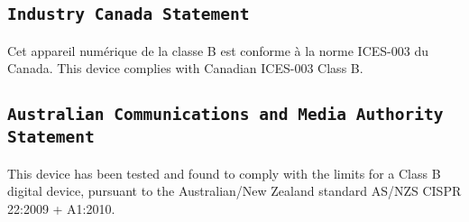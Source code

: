 \subsection{\texttt{Industry Canada Statement}}
Cet appareil numérique de la classe B est conforme à la norme ICES-003
du Canada. This device complies with Canadian ICES-003 Class B.

\subsection{\texttt{Australian Communications and Media Authority Statement}}
This device has been tested and found to comply with the limits for a
Class B digital device, pursuant to the Australian/New Zealand standard AS/NZS CISPR 22:2009 + A1:2010.
